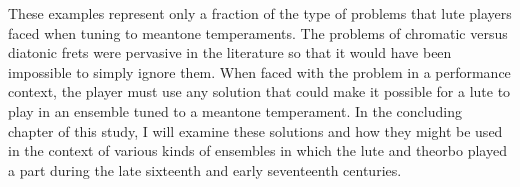 These examples represent only a fraction of the type of problems that lute players
faced when tuning to meantone temperaments.  The problems of chromatic versus diatonic
frets were pervasive in the literature so that it would have been impossible to simply
ignore them.  When faced with the problem in a performance context, the player must use
any solution that could make it possible for a lute to play in an ensemble tuned to a
meantone temperament.  In the concluding chapter of this study, I will examine these
solutions and how they might be used in the context of various kinds of ensembles in
which the lute and theorbo played a part during the late sixteenth and early
seventeenth centuries.